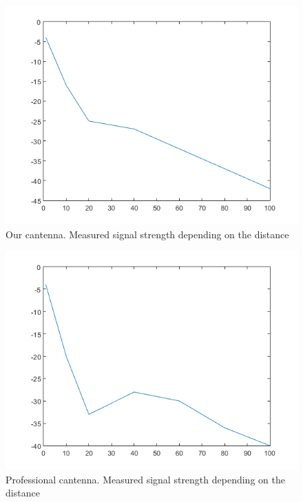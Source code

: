 \usepackage{graphicx}
\begin{figure}
	\includegraphics[width=\textwidth]{plots/can_p.png}
	\caption{Our cantenna. Measured signal strength depending on the distance}
	\label{img:dist:pow:can}
\end{figure}
\begin{figure}
	\includegraphics[width=\textwidth]{plots/prof_p.png}
	\caption{Professional cantenna. Measured signal strength depending on the distance}
	\label{img:dist:pow:prof}
\end{figure}
